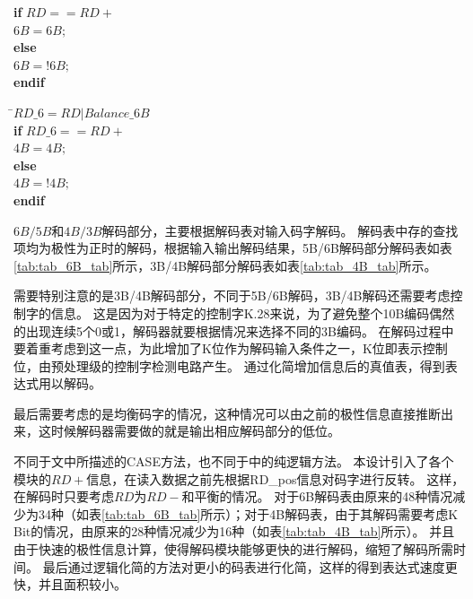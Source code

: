 \documentclass[UTF8]{ctexart}
\newcommand\kw{\textbf}
\begin{document}
\begin{tabbing}
\qquad\=\kw{if} $RD==RD+$ \\
      \>\qquad$6B=6B;$ \\
      \>\kw{else} \\
      \>\qquad$6B=!6B;$ \\
      \>\kw{endif}
\end{tabbing}

\begin{tabbing}
\qquad\=$RD\_6=RD|Balance\_6B$ \\
      \>\kw{if} $RD\_6==RD+$ \\
      \>\qquad$4B=4B;$ \\
      \>\kw{else} \\
      \>\qquad$4B=!4B;$ \\
      \>\kw{endif}
\end{tabbing}

$6B/5B$和$4B/3B$解码部分，主要根据解码表对输入码字解码。
解码表中存的查找项均为极性为正时的解码，根据输入输出解码结果，5B/6B解码部分解码表如表\ref{tab:tab_6B_tab}所示，3B/4B解码部分解码表如表\ref{tab:tab_4B_tab}所示。

需要特别注意的是3B/4B解码部分，不同于5B/6B解码，3B/4B解码还需要考虑控制字的信息。
这是因为对于特定的控制字K.28来说，为了避免整个10B编码偶然的出现连续5个0或1，解码器就要根据情况来选择不同的3B编码。
在解码过程中要着重考虑到这一点，为此增加了K位作为解码输入条件之一，K位即表示控制位，由预处理级的控制字检测电路产生。
通过化简增加信息后的真值表，得到表达式用以解码。

最后需要考虑的是均衡码字的情况，这种情况可以由之前的极性信息直接推断出来，这时候解码器需要做的就是输出相应解码部分的低位。

不同于\cite{Actel1998}文中所描述的CASE方法，也不同于\cite{Widmer1983}中的纯逻辑方法。
本设计引入了各个模块的$RD+$信息，在读入数据之前先根据RD\_pos信息对码字进行反转。
这样，在解码时只要考虑$RD$为$RD-$和平衡的情况。
对于6B解码表由原来的48种情况减少为34种（如表\ref{tab:tab_6B_tab}所示）；对于4B解码表，由于其解码需要考虑K Bit的情况，由原来的28种情况减少为16种（如表\ref{tab:tab_4B_tab}所示）。
并且由于快速的极性信息计算，使得解码模块能够更快的进行解码，缩短了解码所需时间。
最后通过逻辑化简的方法对更小的码表进行化简，这样的得到表达式速度更快，并且面积较小。
\end{document}
